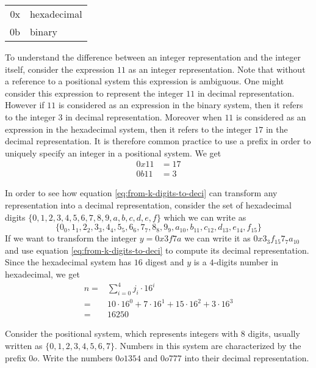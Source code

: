 \begin{center}
\begin{tabular}{rl}
 0x & hexadecimal \\
 0b & binary
\end{tabular}
\end{center} 
\begin{example}
To understand the difference between an integer representation and the integer itself, consider the expression $11$ as an integer representation. Note that without a reference to a positional system this expression is ambiguous. One might consider this expression to represent the integer $11$ in decimal representation. However if $11$ is considered as an expression in the binary system, then it refers to the integer $3$ in decimal representation. Moreover when $11$ is considered as an expression in the hexadecimal system, then it refers to the integer $17$ in the decimal representation. It is therefore common practice to use a prefix in order to uniquely specify an integer in a positional system. We get
\begin{align*}
0x11 & = 17\\
0b11 & = 3
\end{align*}
\end{example}
\begin{example} In order to see how equation 
\ref{eq:from-k-digits-to-deci} can transform any representation into a decimal representation, consider the set of hexadecimal digits $\{0,1,2,3,4,5,6,7,8,9,a,b,c,d,e,f\}$  which we can write as 
$$\{0_0,1_1,2_2,3_3,4_4,5_5,6_6,7_7,8_8,9_9,a_{10},b_{11},c_{12},d_{13},e_{14},f_{15}\}$$
If we want to transform the integer $y=0x3f7a$ we can write it as $0x3_3f_{15}7_7a_{10}$ and use equation \ref{eq:from-k-digits-to-deci} to compute its decimal representation. Since the hexadecimal system has $16$ digest and $y$ is a $4$-digits number in hexadecimal, we get
\begin{align*}
n = & \sum_{i=0}^4 j_i\cdot 16^{i} \\
  = & 10\cdot 16^0+7\cdot 16^1+15\cdot 16^2+3\cdot 16^3\\
  = & 16250
\end{align*}
\end{example}
\begin{exercise}Consider the  positional system, which represents integers with 8 digits, usually written as $\{0,1,2,3,4,5,6,7\}$. Numbers in this system are characterized by the prefix $0o$. Write the numbers $0o1354$ and $0o777$ into their decimal representation.
\end{exercise}

